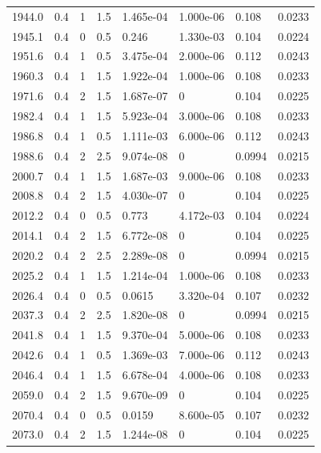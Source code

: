 \documentclass[preview]{standalone}
\begin{document}
{{{{{{{\begin{tabular}{L{1.2cm}C{1.2cm} C{0.3cm}C{0.5cm} C{1.4cm}C{1.4cm} C{1.4cm}C{1.4cm}}
  1944.0  &   0.4  & 1     & 1.5 &  1.465e-04  & 1.000e-06  & 0.108 &  0.0233   \\ 
  1945.1  &   0.4  & 0     & 0.5 &  0.246  & 1.330e-03  & 0.104 &  0.0224   \\ 
  1951.6  &   0.4  & 1     & 0.5 &  3.475e-04  & 2.000e-06  & 0.112 &  0.0243   \\ 
  1960.3  &   0.4  & 1     & 1.5 &  1.922e-04  & 1.000e-06  & 0.108 &  0.0233   \\ 
  1971.6  &   0.4  & 2     & 1.5 &  1.687e-07  & 0  & 0.104 &  0.0225   \\ 
  1982.4  &   0.4  & 1     & 1.5 &  5.923e-04  & 3.000e-06  & 0.108 &  0.0233   \\ 
  1986.8  &   0.4  & 1     & 0.5 &  1.111e-03  & 6.000e-06  & 0.112 &  0.0243   \\ 
  1988.6  &   0.4  & 2     & 2.5 &  9.074e-08  & 0  & 0.0994 &  0.0215   \\ 
  2000.7  &   0.4  & 1     & 1.5 &  1.687e-03  & 9.000e-06  & 0.108 &  0.0233   \\ 
  2008.8  &   0.4  & 2     & 1.5 &  4.030e-07  & 0  & 0.104 &  0.0225   \\ 
  2012.2  &   0.4  & 0     & 0.5 &  0.773  & 4.172e-03  & 0.104 &  0.0224   \\ 
  2014.1  &   0.4  & 2     & 1.5 &  6.772e-08  & 0  & 0.104 &  0.0225   \\ 
  2020.2  &   0.4  & 2     & 2.5 &  2.289e-08  & 0  & 0.0994 &  0.0215   \\ 
  2025.2  &   0.4  & 1     & 1.5 &  1.214e-04  & 1.000e-06  & 0.108 &  0.0233   \\ 
  2026.4  &   0.4  & 0     & 0.5 &  0.0615  & 3.320e-04  & 0.107 &  0.0232   \\ 
  2037.3  &   0.4  & 2     & 2.5 &  1.820e-08  & 0  & 0.0994 &  0.0215   \\ 
  2041.8  &   0.4  & 1     & 1.5 &  9.370e-04  & 5.000e-06  & 0.108 &  0.0233   \\ 
  2042.6  &   0.4  & 1     & 0.5 &  1.369e-03  & 7.000e-06  & 0.112 &  0.0243   \\ 
  2046.4  &   0.4  & 1     & 1.5 &  6.678e-04  & 4.000e-06  & 0.108 &  0.0233   \\ 
  2059.0  &   0.4  & 2     & 1.5 &  9.670e-09  & 0  & 0.104 &  0.0225   \\ 
  2070.4  &   0.4  & 0     & 0.5 &  0.0159  & 8.600e-05  & 0.107 &  0.0232   \\ 
  2073.0  &   0.4  & 2     & 1.5 &  1.244e-08  & 0  & 0.104 &  0.0225   \\ 

\end{tabular}}}}}}}}
\end{document}
